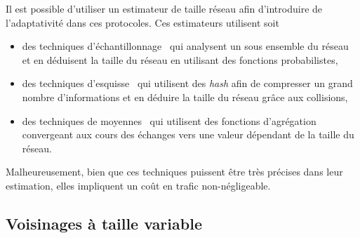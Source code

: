 Il est possible d'utiliser un estimateur de taille réseau afin d'introduire de
l'adaptativité dans ces protocoles. Ces estimateurs utilisent soit
\begin{itemize}
\item des techniques d'échantillonnage~\cite{mane05network, ganesh2007peer,
    kostoulas2007active} qui analysent un sous ensemble du réseau
  et en déduisent la taille du réseau en utilisant des fonctions probabilistes,
\item des techniques d'esquisse~\cite{flajolet2008hyperloglog,
    baquero2012extrema} qui utilisent des \emph{hash} afin de compresser un
  grand nombre d'informations et en déduire la taille du réseau grâce aux
  collisions,
\item des techniques de moyennes~\cite{jelasity2004epidemic, blasa2011symmetric}
  qui utilisent des fonctions d'agrégation convergeant aux cours des échanges
  vers une valeur dépendant de la taille du réseau.
\end{itemize}
Malheureusement, bien que ces techniques puissent être très précises dans leur
estimation, elles impliquent un coût en trafic non-négligeable.

\subsection{Voisinages à taille variable}

